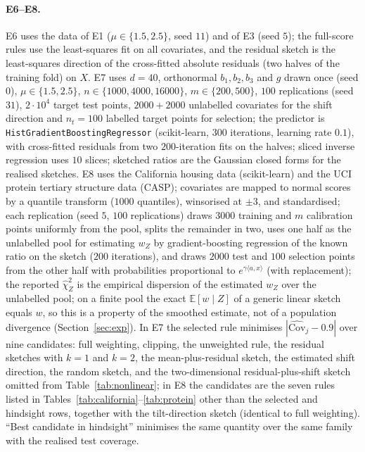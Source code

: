 \documentclass[11pt,a4paper]{article}
\newcommand{\E}{\mathbb{E}}
\theoremstyle{plain}
\theoremstyle{definition}
\theoremstyle{remark}
\begin{document}
\paragraph{E6--E8.} E6 uses the data of E1 ($\mu\in\{1.5,2.5\}$, seed $11$) and of E3 (seed $5$); the full-score rules use the least-squares fit on all covariates, and the residual sketch is the least-squares direction of the cross-fitted absolute residuals (two halves of the training fold) on $X$. E7 uses $d=40$, orthonormal $b_1,b_2,b_3$ and $g$ drawn once (seed $0$), $\mu\in\{1.5,2.5\}$, $n\in\{1000,4000,16000\}$, $m\in\{200,500\}$, $100$ replications (seed $31$), $2\cdot10^4$ target test points, $2000+2000$ unlabelled covariates for the shift direction and $n_t=100$ labelled target points for selection; the predictor is \texttt{HistGradientBoostingRegressor} (scikit-learn, $300$ iterations, learning rate $0.1$), with cross-fitted residuals from two $200$-iteration fits on the halves; sliced inverse regression uses $10$ slices; sketched ratios are the Gaussian closed forms for the realised sketches. E8 uses the California housing data (scikit-learn) and the UCI protein tertiary structure data (CASP); covariates are mapped to normal scores by a quantile transform ($1000$ quantiles), winsorised at $\pm3$, and standardised; each replication (seed $5$, $100$ replications) draws $3000$ training and $m$ calibration points uniformly from the pool, splits the remainder in two, uses one half as the unlabelled pool for estimating $w_Z$ by gradient-boosting regression of the known ratio on the sketch ($200$ iterations), and draws $2000$ test and $100$ selection points from the other half with probabilities proportional to $e^{\gamma\langle a,x\rangle}$ (with replacement); the reported $\hat\chi^2_Z$ is the empirical dispersion of the estimated $w_Z$ over the unlabelled pool; on a finite pool the exact $\E[w\mid Z]$ of a generic linear sketch equals $w$, so this is a property of the smoothed estimate, not of a population divergence (Section~\ref{sec:exp}). In E7 the selected rule minimises $|\widehat{\mathrm{Cov}}_j-0.9|$ over nine candidates: full weighting, clipping, the unweighted rule, the residual sketches with $k=1$ and $k=2$, the mean-plus-residual sketch, the estimated shift direction, the random sketch, and the two-dimensional residual-plus-shift sketch omitted from Table~\ref{tab:nonlinear}; in E8 the candidates are the seven rules listed in Tables~\ref{tab:california}--\ref{tab:protein} other than the selected and hindsight rows, together with the tilt-direction sketch (identical to full weighting). ``Best candidate in hindsight'' minimises the same quantity over the same family with the realised test coverage.




\end{document}
